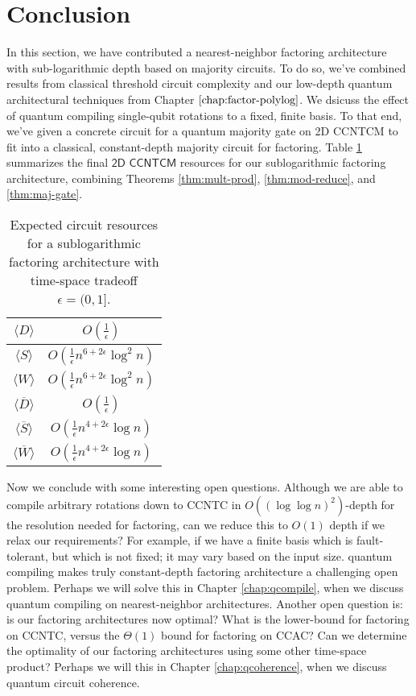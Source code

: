 \section{Conclusion}
\label{sec:fsl-conclude}

In this section, we have contributed a nearest-neighbor factoring architecture with
sub-logarithmic depth based on majority circuits. To do so, we've combined results from classical threshold
circuit complexity and our low-depth quantum architectural techniques from
Chapter $\ref{chap:factor-polylog}$.
We dsicuss the effect of quantum compiling single-qubit rotations to a fixed, finite basis.
To that end, we've given a concrete circuit for
a quantum majority gate on \textsf{2D CCNTCM} to fit into a classical, constant-depth majority circuit
for factoring. Table \ref{tab:sublog-resources} summarizes the final $\textsf{2D CCNTCM}$ resources for our sublogarithmic
factoring architecture, combining Theorems \ref{thm:mult-prod}, \ref{thm:mod-reduce}, and \ref{thm:maj-gate}.

\begin{table}[htb!]
\begin{tabular}{c|c|}
\hline
$\langle D \rangle$ & $O(\frac{1}{\epsilon})$ \\
\hline
$\langle S \rangle$ & $O(\frac{1}{\epsilon}n^{6 + 2\epsilon}\log^2 n)$ \\
\hline
$\langle W \rangle$ & $O(\frac{1}{\epsilon}n^{6 + 2\epsilon}\log^2 n)$ \\
\hline
$\langle \overline{D} \rangle$ & $O(\frac{1}{\epsilon})$ \\
\hline
$\langle \overline{S} \rangle$ & $O(\frac{1}{\epsilon}n^{4+2\epsilon}\log n)$ \\
\hline
$\langle \overline{W} \rangle$ & $O(\frac{1}{\epsilon}n^{4+2\epsilon}\log n)$ \\
\hline
\end{tabular}
\caption{Expected circuit resources for a sublogarithmic factoring architecture with time-space tradeoff $\epsilon = (0,1]$.}
\label{tab:sublog-resources}
\end{table}

Now we conclude with some interesting open questions.
Although we are able to compile arbitrary rotations down to \textsf{CCNTC} in $O((\log \log n)^2)$-depth
for the resolution needed for factoring, can we reduce this to $O(1)$ depth if we relax our
requirements? For example, if we have a finite basis which is fault-tolerant, but which is not fixed;
it may vary based on the input size. quantum compiling makes truly constant-depth factoring architecture a challenging
open problem. Perhaps we will solve this in Chapter \ref{chap:qcompile}, when we discuss quantum compiling on
nearest-neighbor architectures.
Another open question is: is our factoring architectures now optimal?
What is the lower-bound for factoring on \textsf{CCNTC}, versus the $\Theta(1)$ bound for factoring on \textsf{CCAC}?
Can we determine the optimality of our factoring architectures using some other time-space product?
Perhaps we will this in Chapter \ref{chap:qcoherence}, when we discuss quantum circuit coherence. 

